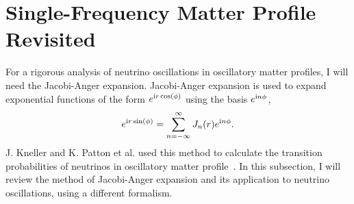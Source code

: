 \section{\label{chap:matter-sec:single-revisted}Single-Frequency Matter Profile Revisited}


For a rigorous analysis of neutrino oscillations in oscillatory matter profiles, I will need the Jacobi-Anger expansion. Jacobi-Anger expansion is used to expand exponential functions of the form $e^{\mathrm{i} r \cos (\phi)}$ using the basis $e^{\mathrm{i} n \phi }$,
\begin{equation}
e^{\mathrm{i} r \sin (\phi)} = \sum_{n=-\infty}^\infty  J_n(r) e^{\mathrm{i} n\phi}.
\end{equation}
J. Kneller and K. Patton et al. used this method to calculate the transition probabilities of neutrinos in oscillatory matter profile~\cite{Kneller2010,Kneller2013,Patton2014}. In this subsection, I will review the method of Jacobi-Anger expansion and its application to neutrino oscillations, using a different formalism. 


